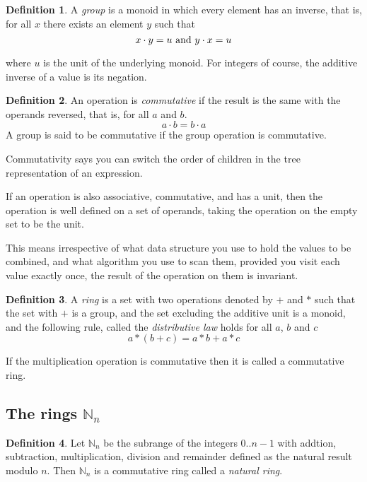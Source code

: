 \documentclass[oneside]{book}
\theoremstyle{plain}
\theoremstyle{definition}
\newtheorem{definition}{Definition}
\theoremstyle{plain}
\begin{document}
\begin{definition}
A {\em group} is a monoid in which every element has an inverse, that is,
for all $x$ there exists an element $y$ such that
$$x \cdot y = u {\rm\ and\ } y \cdot x = u $$
\end{definition}
where $u$ is the unit of the underlying monoid. For integers of course,
the additive inverse of a value is its negation.

\begin{definition}
An operation is {\em commutative} if the result is the same with the operands
reversed, that is, for all $a$ and $b$.
$$a \cdot b = b \cdot a$$
A group is said to be commutative if the group operation is commutative.
\end{definition}

Commutativity says you can switch the order of children in the tree representation
of an expression.

If an operation is also associative, commutative, and has a unit, then the operation
is well defined on a set of operands, taking the operation on the empty
set to be the unit. 

This means irrespective of what data structure you use to hold the
values to be combined, and what algorithm you use to scan them,
provided you visit each value exactly once, the result of the
operation on them is invariant.

\begin{definition}
A {\em ring} is a set with two operations denoted by $+$ and $*$ such
that the set with $+$ is a group, and the set excluding the additive
unit is a monoid, and the following rule, called the
{\em distributive law} holds for all $a$, $b$ and $c$
$$a * (b + c)  = a * b + a * c$$

If the multiplication operation is commutative then it is called
a commutative ring.
\end{definition}

\subsection{The rings $\mathbb{N}_n$}
\begin{definition}
Let $\mathbb{N}_n$ be the subrange of the integers $0..n-1$ with 
addtion, subtraction, 
multiplication, division and remainder defined as the natural result modulo $n$.
Then $\mathbb{N}_n$ is a commutative ring called a {\em natural ring}.
\end{definition}
\end{document}
